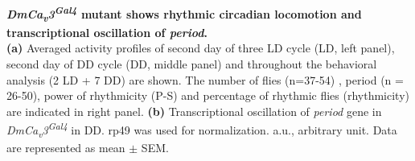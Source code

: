 \label{fig:4}
\textbf{ \emph{DmCa\textsubscript{v}3\textsuperscript{Gal4}} mutant shows rhythmic circadian locomotion and transcriptional oscillation of \emph{period}.}
\\
\textbf{(a)} Averaged activity profiles of second day of three LD cycle (LD, left panel), second day of DD cycle (DD, middle panel) and throughout the behavioral analysis (2 LD + 7 DD) are shown. 
The number of flies (n=37-54) , period (n = 26-50), power of rhythmicity (P-S) and percentage of rhythmic flies (rhythmicity) are indicated in right panel.  
\textbf{(b)}  Transcriptional oscillation of \emph{period} gene in  \emph{DmCa\textsubscript{v}3\textsuperscript{Gal4}} in DD. rp49 was used for normalization. a.u., arbitrary unit.
Data are represented as mean $\pm$ SEM.
  
  
  